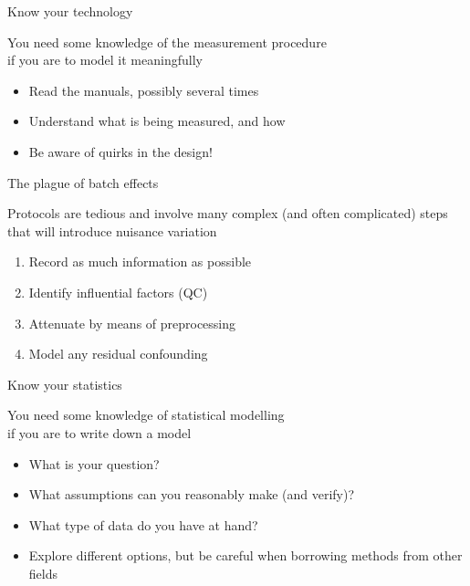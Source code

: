 \begin{frame}[t]{Know your technology}
    \begin{center}
        You need some \alert{knowledge of the measurement procedure}\\
        if you are to model it meaningfully
    \end{center}
    \vfill
    \begin{itemize}
        \item Read the manuals, possibly several times
        \item Understand \alert{what} is being measured, and \alert{how}
        \item Be aware of quirks in the design!
    \end{itemize}
\end{frame}

\begin{frame}[t]{The plague of batch effects}
    \begin{center}
        Protocols are tedious and involve many complex (and often complicated)
        steps that will introduce \alert{nuisance variation}
    \end{center}
    \vfill
    \begin{enumerate}
        \item \alert{Record} as much information as possible
        \item \alert{Identify} influential factors (QC)
        \item \alert{Attenuate} by means of preprocessing
        \item \alert{Model} any residual confounding
    \end{enumerate}
\end{frame}

\begin{frame}[t]{Know your statistics}
    \begin{center}
        You need some \alert{knowledge of statistical modelling} \\
        if you are to write down a model
    \end{center}
    \vfill
    \begin{itemize}
        \item What is your question?
        \item What assumptions can you reasonably make (and verify)?
        \item What type of data do you have at hand?
        \item Explore different options, but be careful when borrowing methods
              from other fields
    \end{itemize}
\end{frame}

